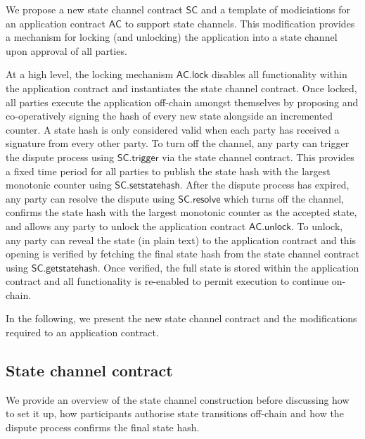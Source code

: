 \documentclass{llncs}
\newcommand{\statechannel}{\mathsf{SC}}
\newcommand{\statechanneldispute}{\mathsf{SC}.\mathsf{trigger}}
\newcommand{\statechannelsetstate}{\mathsf{SC}.\mathsf{setstatehash}}
\newcommand{\statechannelresolve}{\mathsf{SC}.\mathsf{resolve}}
\newcommand{\statechannelgetcommitment}{\mathsf{SC}.\mathsf{getstatehash}}
\newcommand{\appcontract}{\mathsf{AC}}
\newcommand{\applock}{\mathsf{AC.lock}}
\newcommand{\appunlock}{\mathsf{AC.unlock}}
\begin{document}
We propose a new state channel contract $\statechannel$ and a template of modiciations for an application contract $\appcontract$  to support state channels. 
This modification provides a mechanism for locking (and unlocking) the application into a state channel upon approval of all parties. 

At a high level, the locking mechanism $\applock$ disables all functionality within the application contract and instantiates the state channel contract. 
Once locked, all parties execute the application off-chain amongst themselves by proposing  and co-operatively signing the hash of every new state alongside an incremented counter. 
A state hash is only considered valid when each party has received a signature from every other party. 
To turn off the channel, any party can trigger the dispute process using $\statechanneldispute$ via the state channel contract.
This provides  a fixed time period  for all parties to publish the state hash with the largest monotonic counter using $\statechannelsetstate$. 
After the dispute process has expired, any party can resolve the dispute using $\statechannelresolve$ which turns off the channel, confirms the state hash with the largest monotonic counter as the accepted state, and allows any party to unlock the application contract $\appunlock$. 
To unlock, any party can reveal the state (in plain text) to the application contract and this opening is verified by fetching the final state hash from the state channel contract using  $\statechannelgetcommitment$. 
Once verified, the full state is stored within the application contract and all functionality is re-enabled to permit execution to continue on-chain. 

In the following, we present the new state channel contract and the modifications required to an application contract. 


\subsection{State channel contract}


We provide an overview of the state channel construction before discussing how to set it up, how participants authorise state transitions off-chain and how the dispute process confirms the final state hash. 
\end{document}
